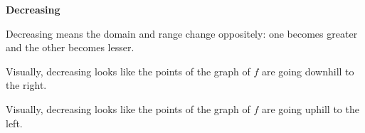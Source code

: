 \documentclass{ximera}
\begin{document}
\begin{idea} \textbf{\textcolor{blue!55!black}{Decreasing}}

Decreasing means the domain and range change oppositely: one becomes greater and the other becomes lesser.
\end{idea}


\begin{observation}
Visually, decreasing looks like the points of the graph of $f$ are going downhill to the right.
\end{observation}

\begin{observation}
Visually, decreasing looks like the points of the graph of $f$ are going uphill to the left.
\end{observation}
\end{document}
